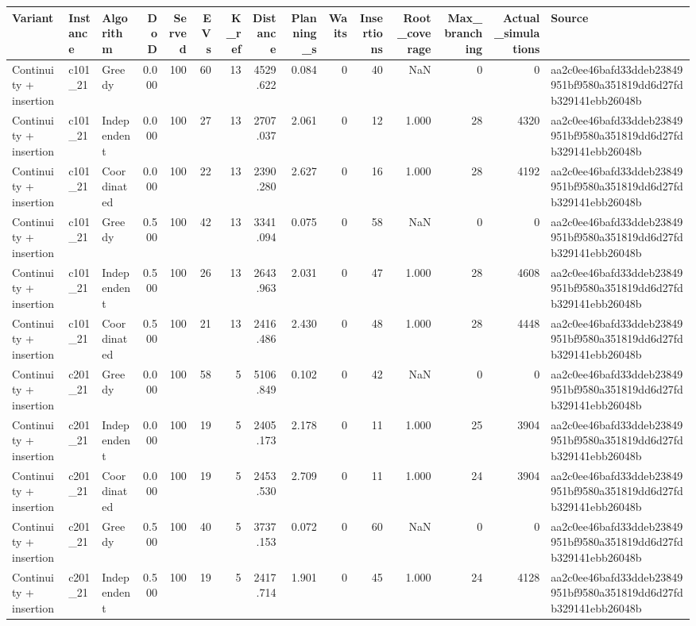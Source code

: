 \begin{tabular}{lllrrrrrrrrrrrl}
\toprule
Variant & Instance & Algorithm & DoD & Served & EVs & K\_ref & Distance & Planning\_s & Waits & Insertions & Root\_coverage & Max\_branching & Actual\_simulations & Source \\
\midrule
Continuity + insertion & c101\_21 & Greedy & 0.000 & 100 & 60 & 13 & 4529.622 & 0.084 & 0 & 40 & NaN & 0 & 0 & aa2c0ee46bafd33ddeb23849951bf9580a351819dd6d27fdb329141ebb26048b \\
Continuity + insertion & c101\_21 & Independent & 0.000 & 100 & 27 & 13 & 2707.037 & 2.061 & 0 & 12 & 1.000 & 28 & 4320 & aa2c0ee46bafd33ddeb23849951bf9580a351819dd6d27fdb329141ebb26048b \\
Continuity + insertion & c101\_21 & Coordinated & 0.000 & 100 & 22 & 13 & 2390.280 & 2.627 & 0 & 16 & 1.000 & 28 & 4192 & aa2c0ee46bafd33ddeb23849951bf9580a351819dd6d27fdb329141ebb26048b \\
Continuity + insertion & c101\_21 & Greedy & 0.500 & 100 & 42 & 13 & 3341.094 & 0.075 & 0 & 58 & NaN & 0 & 0 & aa2c0ee46bafd33ddeb23849951bf9580a351819dd6d27fdb329141ebb26048b \\
Continuity + insertion & c101\_21 & Independent & 0.500 & 100 & 26 & 13 & 2643.963 & 2.031 & 0 & 47 & 1.000 & 28 & 4608 & aa2c0ee46bafd33ddeb23849951bf9580a351819dd6d27fdb329141ebb26048b \\
Continuity + insertion & c101\_21 & Coordinated & 0.500 & 100 & 21 & 13 & 2416.486 & 2.430 & 0 & 48 & 1.000 & 28 & 4448 & aa2c0ee46bafd33ddeb23849951bf9580a351819dd6d27fdb329141ebb26048b \\
Continuity + insertion & c201\_21 & Greedy & 0.000 & 100 & 58 & 5 & 5106.849 & 0.102 & 0 & 42 & NaN & 0 & 0 & aa2c0ee46bafd33ddeb23849951bf9580a351819dd6d27fdb329141ebb26048b \\
Continuity + insertion & c201\_21 & Independent & 0.000 & 100 & 19 & 5 & 2405.173 & 2.178 & 0 & 11 & 1.000 & 25 & 3904 & aa2c0ee46bafd33ddeb23849951bf9580a351819dd6d27fdb329141ebb26048b \\
Continuity + insertion & c201\_21 & Coordinated & 0.000 & 100 & 19 & 5 & 2453.530 & 2.709 & 0 & 11 & 1.000 & 24 & 3904 & aa2c0ee46bafd33ddeb23849951bf9580a351819dd6d27fdb329141ebb26048b \\
Continuity + insertion & c201\_21 & Greedy & 0.500 & 100 & 40 & 5 & 3737.153 & 0.072 & 0 & 60 & NaN & 0 & 0 & aa2c0ee46bafd33ddeb23849951bf9580a351819dd6d27fdb329141ebb26048b \\
Continuity + insertion & c201\_21 & Independent & 0.500 & 100 & 19 & 5 & 2417.714 & 1.901 & 0 & 45 & 1.000 & 24 & 4128 & aa2c0ee46bafd33ddeb23849951bf9580a351819dd6d27fdb329141ebb26048b \\

\end{tabular}
